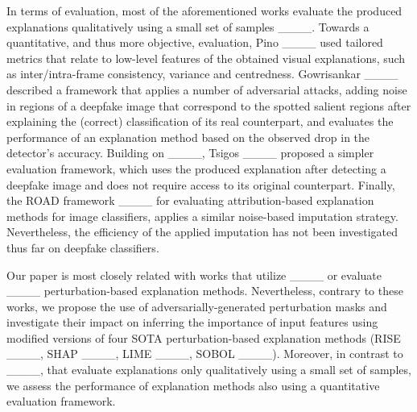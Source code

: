In terms of evaluation, most of the aforementioned works evaluate the produced explanations qualitatively using a small set of samples ____. Towards a quantitative, and thus more objective, evaluation, Pino \etal ____ used tailored metrics that relate to low-level features of the obtained visual explanations, such as inter/intra-frame consistency, variance and centredness. Gowrisankar \etal ____ described a framework that applies a number of adversarial attacks, adding noise in regions of a deepfake image that correspond to the spotted salient regions after explaining the (correct) classification of its real counterpart, and evaluates the performance of an explanation method based on the observed drop in the detector's accuracy. Building on ____, Tsigos \etal ____ proposed a simpler evaluation framework, which uses the produced explanation after detecting a deepfake image and does not require access to its original counterpart. Finally, the ROAD framework ____ for evaluating attribution-based explanation methods for image classifiers, applies a similar noise-based imputation strategy. Nevertheless, the efficiency of the applied imputation has not been investigated thus far on deepfake classifiers. 

Our paper is most closely related with works that utilize ____ or evaluate ____ perturbation-based explanation methods. Nevertheless, contrary to these works, we propose the use of adversarially-generated perturbation masks and investigate their impact on inferring the importance of input features using modified versions of four SOTA perturbation-based explanation methods (RISE ____, SHAP ____, LIME ____, SOBOL ____). Moreover, in contrast to ____, that evaluate explanations only qualitatively using a small set of samples, we assess the performance of explanation methods also using a quantitative evaluation framework.